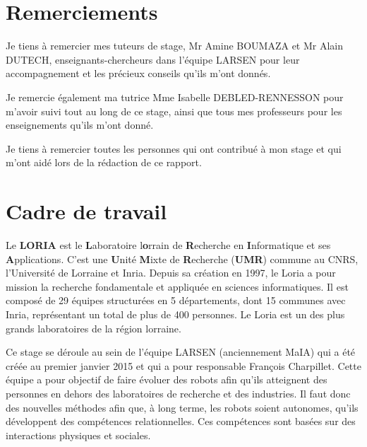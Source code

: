 \documentclass[11pt,french]{report}
\begin{document}
\tableofcontents



\chapter{Remerciements}

Je tiens à remercier mes tuteurs de stage, Mr Amine BOUMAZA et Mr Alain DUTECH, enseignants-chercheurs dans l'équipe LARSEN pour leur accompagnement et les précieux conseils qu'ils m'ont donnés.

Je remercie également ma tutrice Mme Isabelle DEBLED-RENNESSON pour m'avoir suivi tout au long de ce stage, ainsi que tous mes professeurs pour les enseignements qu'ils m'ont donné.

Je tiens à remercier toutes les personnes qui ont contribué à mon stage et qui m'ont aidé lors de la rédaction de ce rapport.


\chapter{Cadre de travail}

Le \textbf{LORIA} est le \textbf{L}aboratoire l\textbf{o}rrain de \textbf{R}echerche en \textbf{I}nformatique et ses \textbf{A}pplications. C'est une \textbf{U}nité \textbf{M}ixte de \textbf{R}echerche (\textbf{UMR}) commune au CNRS, l'Université de Lorraine et Inria.
Depuis sa création en 1997, le Loria a pour mission la recherche fondamentale et appliquée en sciences informatiques. 
Il est composé de 29 équipes structurées en 5 départements, dont 15 communes avec Inria, représentant un total de plus de 400 personnes.
Le Loria est un des plus grands laboratoires de la région lorraine.

Ce stage se déroule au sein de l’équipe LARSEN (anciennement MaIA) qui a été créée au premier janvier 2015 et qui a pour responsable François Charpillet.
Cette équipe a pour objectif de faire évoluer des robots afin qu'ils atteignent des personnes en dehors des laboratoires de recherche et des industries.
Il faut donc des nouvelles méthodes afin que, à long terme, les robots soient autonomes, qu'ils développent des compétences relationnelles.
Ces compétences sont basées sur des interactions physiques et sociales.
\end{document}
